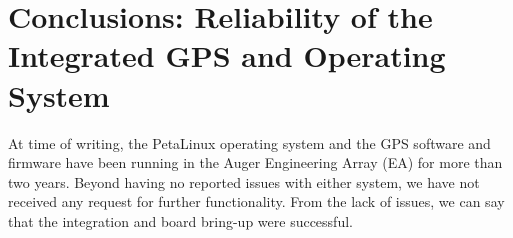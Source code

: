 \section{Conclusions: Reliability of the Integrated GPS and Operating System}
At time of writing, the PetaLinux operating system and the GPS software and firmware have been running in the Auger Engineering Array (EA) for more than two years. Beyond having no reported issues with either system, we have not received any request for further functionality. From the lack of issues, we can say that the integration and board bring-up were successful.







































